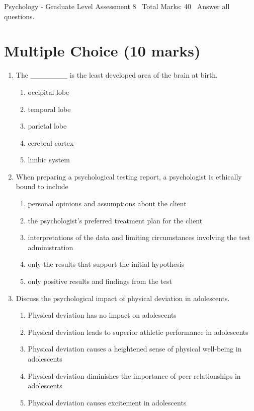 \documentclass[12pt]{article}
\begin{document}
\begin{center}
Psychology - Graduate Level Assessment 8 \
Total Marks: 40 \
Answer all questions.
\end{center}

\section*{Multiple Choice (10 marks)}
\begin{enumerate}[label=\arabic*.]
\item The \_\_\_\_\_\_\_ is the least developed area of the brain at birth.
\begin{enumerate}[label=(\alph*)]
    \item occipital lobe
    \item temporal lobe
    \item parietal lobe
    \item cerebral cortex
    \item limbic system
\end{enumerate}
\item When preparing a psychological testing report, a psychologist is ethically bound to include
\begin{enumerate}[label=(\alph*)]
    \item personal opinions and assumptions about the client
    \item the psychologist's preferred treatment plan for the client
    \item interpretations of the data and limiting circumstances involving the test administration
    \item only the results that support the initial hypothesis
    \item only positive results and findings from the test
\end{enumerate}
\item Discuss the psychological impact of physical deviation in adolescents.
\begin{enumerate}[label=(\alph*)]
    \item Physical deviation has no impact on adolescents
    \item Physical deviation leads to superior athletic performance in adolescents
    \item Physical deviation causes a heightened sense of physical well-being in adolescents
    \item Physical deviation diminishes the importance of peer relationships in adolescents
    \item Physical deviation causes excitement in adolescents

\end{enumerate}
\end{enumerate}
\end{document}
